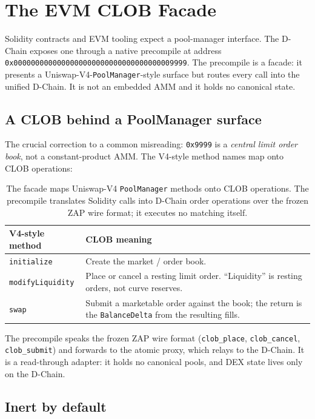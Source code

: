 \section{The EVM CLOB Facade}
\label{sec:precompile}

Solidity contracts and EVM tooling expect a pool-manager interface. The D-Chain exposes
one through a native precompile at address
\texttt{0x0000000000000000000000000000000000009999}. The precompile is a facade: it
presents a Uniswap-V4-\texttt{PoolManager}-style surface but routes every call into the
unified D-Chain. It is not an embedded AMM and it holds no canonical state.

\subsection{A CLOB behind a PoolManager surface}

The crucial correction to a common misreading: \texttt{0x9999} is a \emph{central limit
order book}, not a constant-product AMM. The V4-style method names map onto CLOB
operations:

\begin{table}[H]
\centering
\renewcommand{\arraystretch}{1.25}
\begin{tabular}{p{4.0cm} p{8.0cm}}
\toprule
\textbf{V4-style method} & \textbf{CLOB meaning} \\
\midrule
\texttt{initialize} & Create the market / order book. \\
\texttt{modifyLiquidity} & Place or cancel a resting limit order. ``Liquidity'' is
resting orders, not curve reserves. \\
\texttt{swap} & Submit a marketable order against the book; the return is the
\texttt{BalanceDelta} from the resulting fills. \\
\bottomrule
\end{tabular}
\caption{The facade maps Uniswap-V4 \texttt{PoolManager} methods onto CLOB operations.
The precompile translates Solidity calls into D-Chain order operations over the frozen
ZAP wire format; it executes no matching itself.}
\label{tab:facade}
\end{table}

The precompile speaks the frozen ZAP wire format (\texttt{clob\_place},
\texttt{clob\_cancel}, \texttt{clob\_submit}) and forwards to the atomic proxy, which
relays to the D-Chain. It is a read-through adapter: it holds no canonical pools, and DEX
state lives only on the D-Chain.

\subsection{Inert by default}

